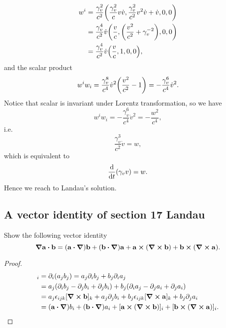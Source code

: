 \documentclass[10pt]{article}
\begin{document}
\begin{align*}
	w^i &= \frac{\gamma_v^2}{c^2} \qty(\frac{\gamma_v^2}{c} v \dot{v}, \frac{\gamma_v^2}{c^2} v^2 \dot{v} + \dot{v}, 0, 0) \\
	&= \frac{\gamma_v^4}{c^2} \dot{v} \qty(\frac{v}{c}, \qty(\frac{v^2}{c^2} + \gamma_v^{-2}),0,0) \\
	&= \frac{\gamma_v^4}{c^2} \dot{v} \qty(\frac{v}{c}, 1,0,0),
\end{align*}
and the scalar product
\begin{equation}
	w^i w_i = \frac{\gamma_v^8}{c^4}\dot{v}^2 \qty(\frac{v^2}{c^2} - 1) = -\frac{\gamma_v^6}{c^4}\dot{v}^2.
\end{equation}
Notice that scalar is invariant under Lorentz transformation, so we have
\begin{equation}
	w^i w_i = -\frac{\gamma_v^6}{c^4}\dot{v}^2 = - \frac{w^2}{c^4},
\end{equation}
i.e.
\begin{equation}
	\frac{\gamma_v^3}{c^2}\dot{v} = w,
\end{equation}
which is equivalent to
\begin{equation}
	\dv{t} \qty(\gamma_v v) = w.
\end{equation}
Hence we reach to Landau's solution.

\subsection{A vector identity of section 17 Landau}
Show the following vector identity
\begin{equation}
	\grad{\vb{a} \vdot \vb{b}} = (\vb{a} \vdot \grad) \vb{b} + (\vb{b} \vdot \grad) \vb{a} + \vb{a} \cross (\curl{\vb{b}}) + \vb{b} \cross (\curl{\vb{a}}).
\end{equation}
\begin{proof}
	\begin{align*}
		[\grad{\vb{a} \vdot \vb{b}}]_i &= \partial_i (a_j b_j) = a_j \partial_i b_j + b_j \partial_i a_j \\
		&= a_j (\partial_i b_j - \partial_j b_i + \partial_j b_i) + b_j (\partial_i a_j - \partial_j a_i + \partial_j a_i) \\
		&= a_j \epsilon_{ijk} [\curl{\vb{b}}]_k + a_j \partial_j b_i + b_j \epsilon_{ijk} [\curl{\vb{a}}]_k + b_j \partial_j a_i \\
		&= (\vb{a} \vdot \grad) b_i + (\vb{b} \vdot \grad) a_i + [\vb{a} \cross (\curl{\vb{b}})]_i + [\vb{b} \cross (\curl{\vb{a}})]_i.
	\end{align*}
\end{proof}
\end{document}
